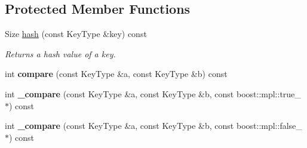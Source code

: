 \subsection*{Protected Member Functions}
\begin{CompactItemize}
\item 
\hypertarget{classLinearHashTable_3_01ValueType_00_01KeyType_00_01MemStorage_00_01SEGMENT__SIZE_00_01DIRECTORc7a065a47b9854d6d22bcaeeb634c1b3_3f6d31e117f0cd6997f4b39279e245ec}{
Size \hyperlink{classLinearHashTable_3_01ValueType_00_01KeyType_00_01MemStorage_00_01SEGMENT__SIZE_00_01DIRECTORc7a065a47b9854d6d22bcaeeb634c1b3_3f6d31e117f0cd6997f4b39279e245ec}{hash} (const KeyType \&key) const }
\label{classLinearHashTable_3_01ValueType_00_01KeyType_00_01MemStorage_00_01SEGMENT__SIZE_00_01DIRECTORc7a065a47b9854d6d22bcaeeb634c1b3_3f6d31e117f0cd6997f4b39279e245ec}

\begin{CompactList}\small\item\em Returns a hash value of a key. \item\end{CompactList}\item 
\hypertarget{classLinearHashTable_3_01ValueType_00_01KeyType_00_01MemStorage_00_01SEGMENT__SIZE_00_01DIRECTORc7a065a47b9854d6d22bcaeeb634c1b3_0ac58a984d11c95f1429a0412510798e}{
int \textbf{compare} (const KeyType \&a, const KeyType \&b) const }
\label{classLinearHashTable_3_01ValueType_00_01KeyType_00_01MemStorage_00_01SEGMENT__SIZE_00_01DIRECTORc7a065a47b9854d6d22bcaeeb634c1b3_0ac58a984d11c95f1429a0412510798e}

\item 
\hypertarget{classLinearHashTable_3_01ValueType_00_01KeyType_00_01MemStorage_00_01SEGMENT__SIZE_00_01DIRECTORc7a065a47b9854d6d22bcaeeb634c1b3_244e24cccffdb1d255f58e73589a62c8}{
int \textbf{\_\-compare} (const KeyType \&a, const KeyType \&b, const boost::mpl::true\_\- $\ast$) const }
\label{classLinearHashTable_3_01ValueType_00_01KeyType_00_01MemStorage_00_01SEGMENT__SIZE_00_01DIRECTORc7a065a47b9854d6d22bcaeeb634c1b3_244e24cccffdb1d255f58e73589a62c8}

\item 
\hypertarget{classLinearHashTable_3_01ValueType_00_01KeyType_00_01MemStorage_00_01SEGMENT__SIZE_00_01DIRECTORc7a065a47b9854d6d22bcaeeb634c1b3_469747e38ad361b00433b148908f1e72}{
int \textbf{\_\-compare} (const KeyType \&a, const KeyType \&b, const boost::mpl::false\_\- $\ast$) const }
\label{classLinearHashTable_3_01ValueType_00_01KeyType_00_01MemStorage_00_01SEGMENT__SIZE_00_01DIRECTORc7a065a47b9854d6d22bcaeeb634c1b3_469747e38ad361b00433b148908f1e72}


\end{CompactItemize}

